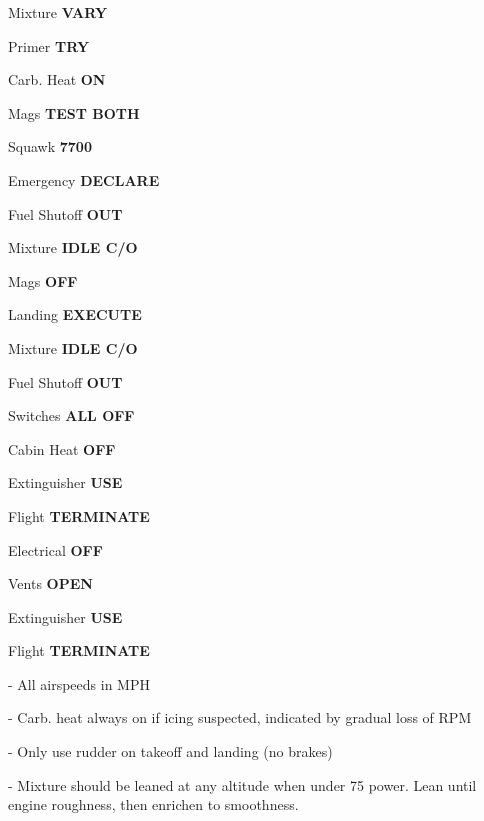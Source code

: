 \documentclass[8pt]{article}
\begin{document}
\begin{multicols*}{3}
Mixture \dotfill \textbf{VARY}

Primer \dotfill \textbf{TRY}

Carb. Heat \dotfill \textbf{ON}

Mags \dotfill \textbf{TEST BOTH}

\colorbox{orange!80}{}

Squawk \dotfill \textbf{7700}

Emergency \dotfill \textbf{DECLARE}

Fuel Shutoff \dotfill \textbf{OUT}

Mixture \dotfill \textbf{IDLE C/O}

Mags \dotfill \textbf{OFF}

Landing \dotfill \textbf{EXECUTE}

\colorbox{red!80}{}

Mixture \dotfill \textbf{IDLE C/O}

Fuel Shutoff \dotfill \textbf{OUT}

Switches \dotfill \textbf{ALL OFF}

Cabin Heat \dotfill \textbf{OFF}

Extinguisher \dotfill \textbf{USE}

Flight \dotfill \textbf{TERMINATE} \\

\colorbox{red!80}{}

Electrical \dotfill \textbf{OFF}

Vents \dotfill \textbf{OPEN}

Extinguisher \dotfill \textbf{USE}

\colorbox{orange!80}{}

Flight \dotfill \textbf{TERMINATE} \\

\colorbox{orange!80}{}

- All airspeeds in MPH

- Carb. heat always on if icing suspected, indicated by gradual loss of RPM

- Only use rudder on takeoff and landing (no brakes)

- Mixture should be leaned at any altitude when under 75 power. Lean until engine roughness, then enrichen to smoothness.

\end{multicols*}
\end{document}
